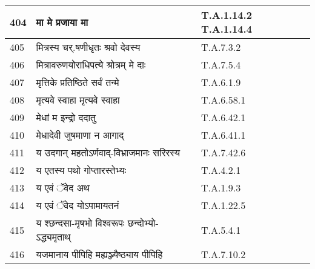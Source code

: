 \documentclass[17pt]{extarticle}
\begin{document}
\begin{longtable}{||p{0.4in}||p{4.9in}||p{0.9in}||}
    \hline
        
    404 & मा मे प्रजाया मा & T.A.1.14.2 T.A.1.14.4       \\
    
    \hline
        
    405 & मित्रस्य चर्.षणीधृतः श्रवो देवस्य & T.A.7.3.2       \\
    
    \hline
        
    406 & मित्रावरुणयोराधिपत्ये श्रोत्रम् मे दाः & T.A.7.5.4       \\
    
    \hline
        
    407 & मृत्तिके प्रतिष्ठिते सर्वं तन्मे & T.A.6.1.9       \\
    
    \hline
        
    408 & मृत्यवे स्वाहा मृत्यवे स्वाहा & T.A.6.58.1       \\
    
    \hline
        
    409 & मेधां म इन्द्रो ददातु & T.A.6.42.1       \\
    
    \hline
        
    410 & मेधादेवी जुषमाणा न आगाद् & T.A.6.41.1       \\
    
    \hline
        
    411 & य उदगान् महतोऽर्णवाद्{-}विभ्राजमानः सरिरस्य & T.A.7.42.6       \\
    
    \hline
        
    412 & य एतस्य पथो गोप्तारस्तेभ्यः & T.A.4.2.1       \\
    
    \hline
        
    413 & य एवं ॅवेद अथ & T.A.1.9.3       \\
    
    \hline
        
    414 & य एवं ॅवेद योऽपामायतनं & T.A.1.22.5       \\
    
    \hline
        
    415 & य श्छन्दसा{-}मृषभो विश्वरूपः छन्दोभ्यो{-}ऽद्ध्यमृताथ् & T.A.5.4.1       \\
    
    \hline
        
    416 & यजमानाय पीपिहि मह्यञ्ज्यैष्ठ्याय पीपिहि & T.A.7.10.2       \\
    

\end{longtable}
\end{document}

